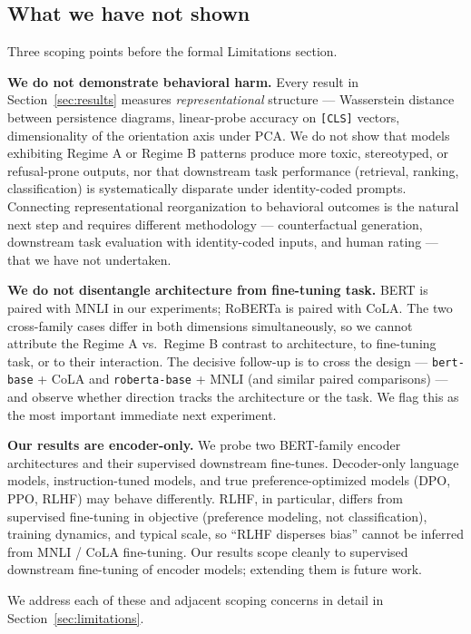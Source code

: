 \documentclass[11pt]{article}
\begin{document}
\subsection{What we have not shown}\label{sec:not_shown}

Three scoping points before the formal Limitations section.

\textbf{We do not demonstrate behavioral harm.} Every result in Section~\ref{sec:results} measures \textit{representational} structure --- Wasserstein distance between persistence diagrams, linear-probe accuracy on \texttt{[CLS]} vectors, dimensionality of the orientation axis under PCA. We do not show that models exhibiting Regime A or Regime B patterns produce more toxic, stereotyped, or refusal-prone outputs, nor that downstream task performance (retrieval, ranking, classification) is systematically disparate under identity-coded prompts. Connecting representational reorganization to behavioral outcomes is the natural next step and requires different methodology --- counterfactual generation, downstream task evaluation with identity-coded inputs, and human rating --- that we have not undertaken.

\textbf{We do not disentangle architecture from fine-tuning task.} BERT is paired with MNLI in our experiments; RoBERTa is paired with CoLA. The two cross-family cases differ in both dimensions simultaneously, so we cannot attribute the Regime A vs.\ Regime B contrast to architecture, to fine-tuning task, or to their interaction. The decisive follow-up is to cross the design --- \texttt{bert-base} + CoLA and \texttt{roberta-base} + MNLI (and similar paired comparisons) --- and observe whether direction tracks the architecture or the task. We flag this as the most important immediate next experiment.

\textbf{Our results are encoder-only.} We probe two BERT-family encoder architectures and their supervised downstream fine-tunes. Decoder-only language models, instruction-tuned models, and true preference-optimized models (DPO, PPO, RLHF) may behave differently. RLHF, in particular, differs from supervised fine-tuning in objective (preference modeling, not classification), training dynamics, and typical scale, so ``RLHF disperses bias'' cannot be inferred from MNLI / CoLA fine-tuning. Our results scope cleanly to supervised downstream fine-tuning of encoder models; extending them is future work.

We address each of these and adjacent scoping concerns in detail in Section~\ref{sec:limitations}.
\end{document}
